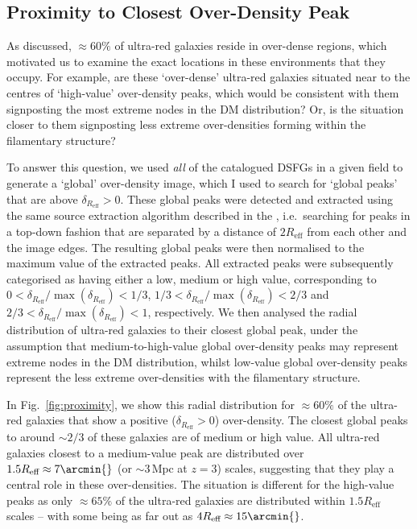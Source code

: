 \documentclass[a4paper, fleqn, usenatbib]{mnras}
\newcommand{\megaparsec}{\text{Mpc}}
\newcommand{\reff}{R_{\text{eff}}}
\newcommand{\urgs}{ultra-red galaxies}
\begin{document}
\subsection{Proximity to Closest Over-Density Peak}

As discussed, $\approx60\%$ of \urgs{} reside in over-dense regions, which motivated us to examine the exact locations in these environments that they occupy.
For example, are these `over-dense' \urgs{} situated near to the centres of `high-value' over-density peaks, which would be consistent with them signposting the most extreme nodes in the DM distribution?
Or, is the situation closer to them signposting less extreme over-densities forming within the filamentary structure?

To answer this question, we used \emph{all} of the catalogued DSFGs in a given field to generate a `global' over-density image, which I used to search for `global peaks' that are above $\delta_{\reff{}}>0$.
These global peaks were detected and extracted using the same source extraction algorithm described in the , i.e.\ searching for peaks in a top-down fashion that are separated by a distance of $2\reff{}$ from each other and the image edges.
The resulting global peaks were then normalised to the maximum value of the extracted peaks.
All extracted peaks were subsequently categorised as having either a low, medium or high value, corresponding to $0<\delta_{\reff{}}/\max{(\delta_{\reff{}})}<1/3$, $1/3<\delta_{\reff{}}/\max{(\delta_{\reff{}})}<2/3$ and $2/3<\delta_{\reff{}}/\max{(\delta_{\reff{}})}<1$, respectively.
We then analysed the radial distribution of \urgs{} to their closest global peak, under the assumption that medium-to-high-value global over-density peaks may represent extreme nodes in the DM distribution, whilst low-value global over-density peaks represent the less extreme over-densities with the filamentary structure.

In Fig.~\ref{fig:proximity}, we show this radial distribution for $\approx60\%$ of the \urgs{} that show a positive ($\delta_{\reff{}}>0$) over-density.
The closest global peaks to around $\sim2/3$ of these galaxies are of medium or high value.
All \urgs{} closest to a medium-value peak are distributed over $1.5\reff{}\approx7\arcmin{}$ (or $\sim3\,\megaparsec{}$ at $z=3$) scales, suggesting that they play a central role in these over-densities.
The situation is different for the high-value peaks as only $\approx65\%$ of the \urgs{} are distributed within $1.5\reff{}$ scales -- with some being as far out as $4\reff{}\approx15\arcmin{}$.
\end{document}
